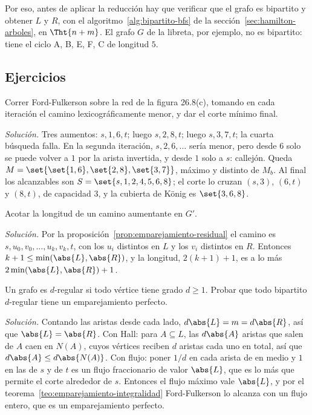 \documentclass[11pt,letterpaper]{article}
\begin{document}
Por eso, antes de aplicar la reducción hay que verificar que el grafo
es bipartito y obtener $L$ y $R$, con el
algoritmo~\ref{alg:bipartito-bfs} de la
sección~\ref{sec:hamilton-arboles}, en $\Tht{n + m}$. El grafo $G$ de
la libreta, por ejemplo, no es bipartito: tiene el ciclo
A, B, E, F, C de longitud $5$.


\subsection*{Ejercicios}

\begin{ejercicio}[Cormen 26.3-1]
  Correr Ford-Fulkerson sobre la red de la figura 26.8(c), tomando en
  cada iteración el camino lexicográficamente menor, y dar el corte
  mínimo final.

  \textit{Solución.} Tres aumentos: $s, 1, 6, t$; luego
  $s, 2, 8, t$; luego $s, 3, 7, t$; la cuarta búsqueda falla. En la
  segunda iteración, $s, 2, 6, \dots$ sería menor, pero desde $6$ solo
  se puede volver a $1$ por la arista invertida, y desde $1$ solo a
  $s$: callejón. Queda $M = \set{\set{1,6}, \set{2,8}, \set{3,7}}$,
  máximo y distinto de $M_b$. Al final los alcanzables son
  $S = \set{s, 1, 2, 4, 5, 6, 8}$; el corte lo cruzan $(s, 3)$,
  $(6, t)$ y $(8, t)$, de capacidad $3$, y la cubierta de König es
  $\set{3, 6, 8}$.
\end{ejercicio}

\begin{ejercicio}[Cormen 26.3-3]
  Acotar la longitud de un camino aumentante en $G'$.

  \textit{Solución.} Por la proposición~\ref{prop:emparejamiento-residual}
  el camino es $s, u_0, v_0, \dots, u_k, v_k, t$, con los $u_i$
  distintos en $L$ y los $v_i$ distintos en $R$. Entonces
  $k + 1 \le \min(\abs{L}, \abs{R})$, y la longitud, $2(k + 1) + 1$,
  es a lo más $2\min(\abs{L}, \abs{R}) + 1$.
\end{ejercicio}

\begin{ejercicio}[Cormen 26.3-5]
  Un grafo es $d$-regular si todo vértice tiene grado $d \ge 1$.
  Probar que todo bipartito $d$-regular tiene un emparejamiento
  perfecto.

  \textit{Solución.} Contando las aristas desde cada lado,
  $d\abs{L} = m = d\abs{R}$, así que $\abs{L} = \abs{R}$. Con Hall:
  para $A \subseteq L$, las $d\abs{A}$ aristas que salen de $A$ caen
  en $N(A)$, cuyos vértices reciben $d$ aristas cada uno en total, así
  que $d\abs{A} \le d\abs{N(A)}$. Con flujo: poner $1/d$ en cada
  arista de en medio y $1$ en las de $s$ y de $t$ es un flujo
  fraccionario de valor $\abs{L}$, que es lo más que permite el corte
  alrededor de $s$. Entonces el flujo máximo vale $\abs{L}$, y por el
  teorema~\ref{teo:emparejamiento-integralidad} Ford-Fulkerson lo alcanza con un
  flujo entero, que es un emparejamiento perfecto.
\end{ejercicio}
\end{document}
